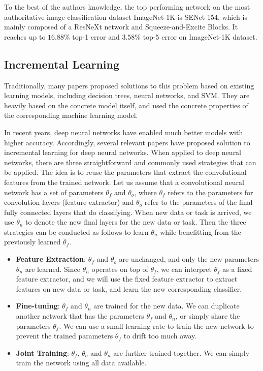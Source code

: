 To the best of the authors knowledge, the top performing network on the most authoritative image classification dataset ImageNet-1K is SENet-154\cite{hu2017squeeze}, which is mainly composed of a ResNeXt network and Squeeze-and-Excite Blocks. It reaches up to $16.88\%$ top-1 error and $3.58\%$ top-5 error on ImageNet-1K dataset.

\subsection{Incremental Learning}
Traditionally, many papers proposed solutions to this problem based on existing learning models, including decision trees\cite{utgoff1989incremental}, neural networks\cite{polikar2001learn++}, and SVM\cite{diehl2003svm}. They are heavily based on the concrete model itself, and used the concrete properties of the corresponding machine learning model.

In recent years, deep neural networks have enabled much better models with higher accuracy. Accordingly, several relevant papers have proposed solution to incremental learning for deep neural networks. When applied to deep neural networks, there are three straightforward and commonly used strategies that can be applied. The idea is to reuse the parameters that extract the convolutional features from the trained network. Let us assume that a convolutional neural network has a set of parameters $\theta_f$ and $\theta_o$, where $\theta_f$ refers to the parameters for convolution layers (feature extractor) and $\theta_o$ refer to the parameters of the final fully connected layers that do classifying. When new data or task is arrived, we use $\theta_n$ to denote the new final layers for the new data or task. Then the three strategies can be conducted as follows to learn $\theta_n$ while benefitting from the previously learned $\theta_f$.
\begin{itemize}
	\item \textbf{Feature Extraction}: $\theta_f$ and $\theta_o$ are unchanged, and only the new parameters $\theta_n$ are learned. Since $\theta_n$ operates on top of $\theta_f$, we can interpret $\theta_f$ as a fixed feature extractor, and we will use the fixed feature extractor to extract features on new data or task, and learn the new corresponding classifier.
	\item \textbf{Fine-tuning}: $\theta_f$ and $\theta_n$ are trained for the new data. We can duplicate another network that has the parameters $\theta_f$ and $\theta_n$, or simply share the parameters $\theta_f$. We can use a small learning rate to train the new network to prevent the trained parameters $\theta_f$ to drift too much away.
	\item \textbf{Joint Training}: $\theta_f$, $\theta_o$ and $\theta_n$ are further trained together. We can simply train the network using all data available.
\end{itemize}

